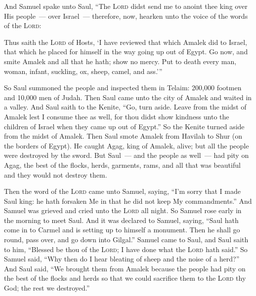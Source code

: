 
\begin{inparaenum}
   And Samuel spake unto Saul, ``The \textsc{Lord} didst send me to anoint thee king over His people~--- over Israel~--- therefore, now, hearken unto the voice of the words of the \textsc{Lord}:%
  
   Thus saith the \textsc{Lord} of Hosts, `I have reviewed that which Amalek did to Israel, that which he placed for himself in the way going up out of Egypt.%
   Go now, and smite Amalek and all that he hath; show no mercy. Put to death every man, woman, infant, suckling, ox, sheep, camel, and ass.'''%
  
   So Saul summoned the people and inspected them in Telaim: 200,000 footmen and 10,000 men of Judah.%
   Then Saul came unto the city of Amalek and waited in a valley.%
   And Saul saith to the Kenite, ``Go, turn aside. Leave from the midst of Amalek lest I consume thee as well, for thou didst show kindness unto the children of Israel when they came up out of Egypt.'' So the Kenite turned aside from the midst of Amalek.%
   Then Saul smote Amalek from Havilah to Shur (on the borders of Egypt).%
   He caught Agag, king of Amalek, alive; but all the people were destroyed by the sword.%
   But Saul~--- and the people as well~--- had pity on Agag, the best of the flocks, herds, garments, rams, and all that was beautiful and they would not destroy them.%
  
   Then the word of the \textsc{Lord} came unto Samuel, saying,%
   ``I'm sorry that I made Saul king: he hath forsaken Me in that he did not keep My commandments.'' And Samuel was grieved and cried unto the \textsc{Lord} all night.%
   So Samuel rose early in the morning to meet Saul. And it was declared to Samuel, saying, ``Saul hath come in to Carmel and is setting up to himself a monument. Then he shall go round, pass over, and go down into Gilgal.''%
   Samuel came to Saul, and Saul saith to him, ``Blessed be thou of the \textsc{Lord}; I have done what the \textsc{Lord} hath said.''%
   So Samuel said, ``Why then do I hear bleating of sheep and the noise of a herd?''%
   And Saul said, ``We brought them from Amalek because the people had pity on the best of the flocks and herds so that we could sacrifice them to the \textsc{Lord} thy God; the rest we destroyed.''%
  

\end{inparaenum}
